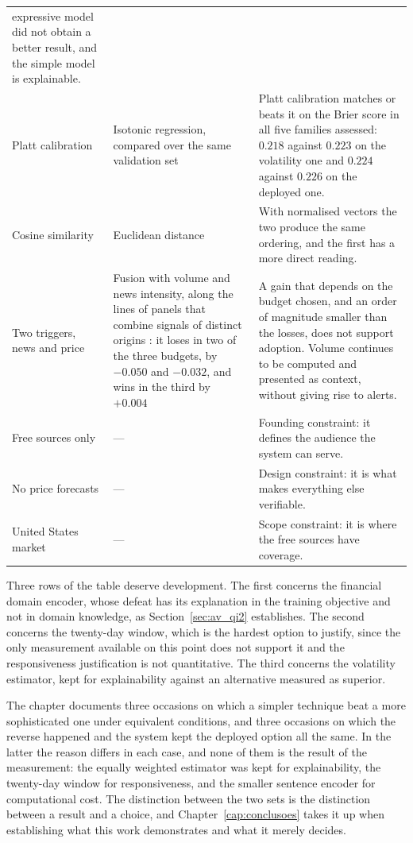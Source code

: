 \begin{table}[!htbp]
\begin{tabular}{L{0.19\textwidth} L{0.30\textwidth} L{0.39\textwidth}}
expressive model did not obtain a better result, and the simple model is explainable. \\
\addlinespace
Platt calibration & Isotonic regression, compared over the same validation set & Platt calibration
matches or beats it on the Brier score in all five families assessed: $0.218$ against $0.223$ on the
volatility one and $0.224$ against $0.226$ on the deployed one. \\
\addlinespace
Cosine similarity & Euclidean distance & With normalised vectors the two produce the same ordering,
and the first has a more direct reading. \\
\addlinespace
Two triggers, news and price & Fusion with volume and news intensity, along the lines of panels
that combine signals of distinct origins \autocite{worldmonitor2026}: it loses in two of the three
budgets, by $-0.050$ and $-0.032$, and wins in the third by $+0.004$ & A gain that depends on the
budget chosen, and an order of magnitude smaller than the losses, does not support adoption. Volume
continues to be computed and presented as context, without giving rise to alerts. \\
\midrule
Free sources only & --- & Founding constraint: it defines the audience the system can serve. \\
No price forecasts & --- & Design constraint: it is what makes everything else verifiable. \\
United States market & --- & Scope constraint: it is where the free sources have coverage. \\
\bottomrule
\end{tabular}
\end{table}

Three rows of the table deserve development. The first concerns the financial domain encoder, whose
defeat has its explanation in the training objective and not in domain knowledge, as
Section~\ref{sec:av_qi2} establishes. The second concerns the twenty-day window, which is the
hardest option to justify, since the only measurement available on this point does not support it
and the responsiveness justification is not quantitative. The third concerns the volatility
estimator, kept for explainability against an alternative measured as superior.

The chapter documents three occasions on which a simpler technique beat a more sophisticated one
under equivalent conditions, and three occasions on which the reverse happened and the system kept
the deployed option all the same. In the latter the reason differs in each case, and none of them
is the result of the measurement: the equally weighted estimator was kept for explainability, the
twenty-day window for responsiveness, and the smaller sentence encoder for computational cost. The
distinction between the two sets is the distinction between a result and a choice, and
Chapter~\ref{cap:conclusoes} takes it up when establishing what this work demonstrates and what it
merely decides.
